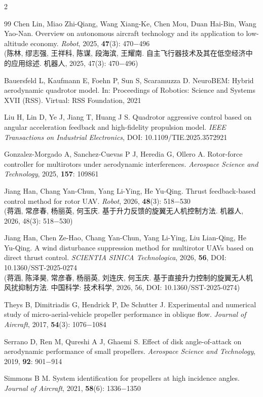 \documentclass{aas}
\begin{document}
\begin{multicols}{2}
\begin{thebibliography}{99}
 Chen Lin, Miao Zhi-Qiang, Wang Xiang-Ke, Chen Mou, Duan Hai-Bin, Wang Yao-Nan. Overview on autonomous aircraft technology and its application to low-altitude economy. {\sl Robot}, 2025, {\bf 47}(3): 470$-$496 \\
(陈林, 缪志强, 王祥科, 陈谋, 段海滨, 王耀南. 自主飞行器技术及其在低空经济中的应用综述. 机器人, 2025, 47(3): 470$-$496)

 Bauersfeld L, Kaufmann E, Foehn P, Sun S, Scaramuzza D. NeuroBEM: Hybrid aerodynamic quadrotor model. In: Proceedings of Robotics: Science and Systems XVII (RSS). Virtual: RSS Foundation, 2021

 Liu H, Lin D, Ye J, Jiang T, Huang J S. Quadrotor aggressive control based on angular acceleration feedback and high-fidelity propulsion model. {\sl IEEE Transactions on Industrial Electronics}, DOI: 10.1109/TIE.2025.3572921

 Gonzalez-Morgado A, Sanchez-Cuevas P J, Heredia G, Ollero A. Rotor-force controller for multirotors under aerodynamic interferences. {\sl Aerospace Science and Technology}, 2025, {\bf 157}: 109861

 Jiang Han, Chang Yan-Chun, Yang Li-Ying, He Yu-Qing. Thrust feedback-based control method for rotor UAV. {\sl Robot}, 2026, {\bf 48}(3): 518$-$530 \\
(蒋涵, 常彦春, 杨丽英, 何玉庆. 基于升力反馈的旋翼无人机控制方法. 机器人, 2026, 48(3): 518$-$530)

 Jiang Han, Chen Ze-Hao, Chang Yan-Chun, Yang Li-Ying, Liu Lian-Qing, He Yu-Qing. A wind disturbance suppression method for multirotor UAVs based on direct thrust control. {\sl SCIENTIA SINICA Technologica}, 2026, {\bf 56}, DOI: 10.1360/SST-2025-0274 \\
(蒋涵, 陈泽昊, 常彦春, 杨丽英, 刘连庆, 何玉庆. 基于直接升力控制的旋翼无人机风扰抑制方法. 中国科学: 技术科学, 2026, 56, DOI: 10.1360/SST-2025-0274)

 Theys B, Dimitriadis G, Hendrick P, De Schutter J. Experimental and numerical study of micro-aerial-vehicle propeller performance in oblique flow. {\sl Journal of Aircraft}, 2017, {\bf 54}(3): 1076$-$1084

 Serrano D, Ren M, Qureshi A J, Ghaemi S. Effect of disk angle-of-attack on aerodynamic performance of small propellers. {\sl Aerospace Science and Technology}, 2019, {\bf 92}: 901$-$914

 Simmons B M. System identification for propellers at high incidence angles. {\sl Journal of Aircraft}, 2021, {\bf 58}(6): 1336$-$1350


\end{thebibliography}
\end{multicols}
\end{document}
